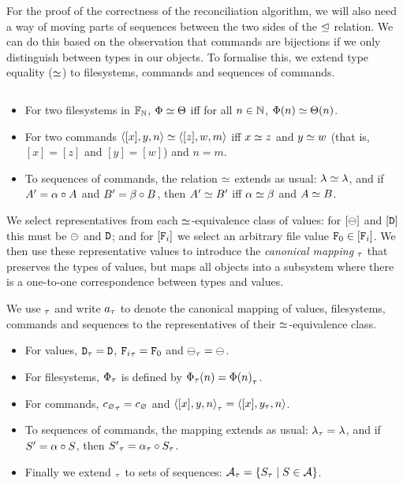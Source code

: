 \bigskip


\noindent
For the proof of the correctness of the reconciliation algorithm,
we will also need a way of moving parts of sequences between the two
sides of the $\trianglelefteq$ relation.
We can do this based on the observation that commands are bijections
if we only distinguish between types in our objects.
To formalise this, we extend type equality ($\simeq$)
to filesystems, commands and sequences of commands.
\begin{mydef}
$ $ %
\begin{itemize}
\item For two filesystems in $\mathbb{F}_{\mathbb{N}}$, $\Phi\simeq\Theta$ iff
for all $n\in\mathbb{N}$, $\Phi(n) \simeq \Theta(n)$.
\item For two commands $\langle{[x],y,n}\rangle\simeq\langle{[z],w,m}\rangle$ iff 
$x\simeq z$ and $y\simeq w$
(that is, $[x]=[z]$ and $[y]=[w]$)
and $n=m$.
\item To sequences of commands, the relation $\simeq$ extends as usual: $\lambda\simeq\lambda$, and
if $A'=\alpha\mathbin{\circ} A$ and $B'=\beta\mathbin{\circ} B$, then $A'\simeq B'$ iff $\alpha\simeq\beta$ and $A\simeq B$.
\end{itemize}
\end{mydef}

We select representatives from each $\simeq$-equivalence class of values:
for $[\ominus]$ and $[\mathtt{D}]$ this must be $\ominus$ and $\mathtt{D}$; and
for $[\mathtt{F}_i]$ we select an arbitrary file value $\mathtt{F}_0\in[\mathtt{F}_i]$.
We then use these representative values to
introduce the \emph{canonical mapping} ${}_\tau$ that preserves the types of values,
but maps all objects into a subsystem where there is a one-to-one
correspondence between types and values.

\begin{mydef}
We use ${}_\tau$ and write ${a}_\tau$ to denote the canonical mapping of 
values, filesystems, commands and sequences to the
representatives of their $\simeq$-equivalence class.
\begin{itemize}
\item For values, ${\mathtt{D}}_\tau=\mathtt{D}$, ${\mathtt{F}_i}_\tau=\mathtt{F}_0$ and ${\ominus}_\tau=\ominus$.
\item For filesystems, ${\Phi}_\tau$ is defined by ${\Phi}_\tau(n) = {\Phi(n)}_\tau$.
\item For commands, ${c_\varnothing}_\tau=c_\varnothing$ and ${\langle{[x],y,n}\rangle}_\tau = \langle{[{x}],{y}_\tau,{n}}\rangle$.
\item To sequences of commands, the mapping extends as usual: ${\lambda}_\tau=\lambda$, and if $S'=\alpha\mathbin{\circ} S$, then ${S'}_\tau={\alpha}_\tau\mathbin{\circ} {S}_\tau$.
\item Finally we extend ${}_\tau$ to sets of sequences: ${\mathcal{A}}_\tau = \{{S}_\tau \mathrel{|} S\in\mathcal{A}\}$.
\end{itemize}
\end{mydef}

